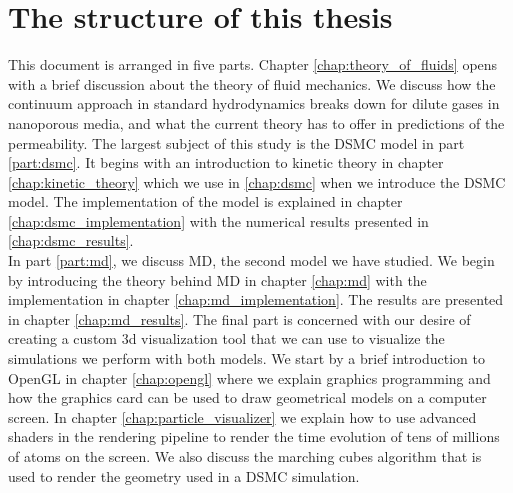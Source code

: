\section{The structure of this thesis}
This document is arranged in five parts. Chapter \ref{chap:theory_of_fluids} opens with a brief discussion about the theory of fluid mechanics. We discuss how the continuum approach in standard hydrodynamics breaks down for dilute gases in nanoporous media, and what the current theory has to offer in predictions of the permeability. The largest subject of this study is the DSMC model in part \ref{part:dsmc}. It begins with an introduction to kinetic theory in chapter \ref{chap:kinetic_theory} which we use in \ref{chap:dsmc} when we introduce the DSMC model. The implementation of the model is explained in chapter \ref{chap:dsmc_implementation} with the numerical results presented in \ref{chap:dsmc_results}.\\
In part \ref{part:md}, we discuss MD, the second model we have studied. We begin by introducing the theory behind MD in chapter \ref{chap:md} with the implementation in chapter \ref{chap:md_implementation}. The results are presented in chapter \ref{chap:md_results}. The final part is concerned with our desire of creating a custom 3d visualization tool that we can use to visualize the simulations we perform with both models. We start by a brief introduction to OpenGL in chapter \ref{chap:opengl} where we explain graphics programming and how the graphics card can be used to draw geometrical models on a computer screen. In chapter \ref{chap:particle_visualizer} we explain how to use advanced shaders in the rendering pipeline to render the time evolution of tens of millions of atoms on the screen. We also discuss the marching cubes algorithm that is used to render the geometry used in a DSMC simulation.

